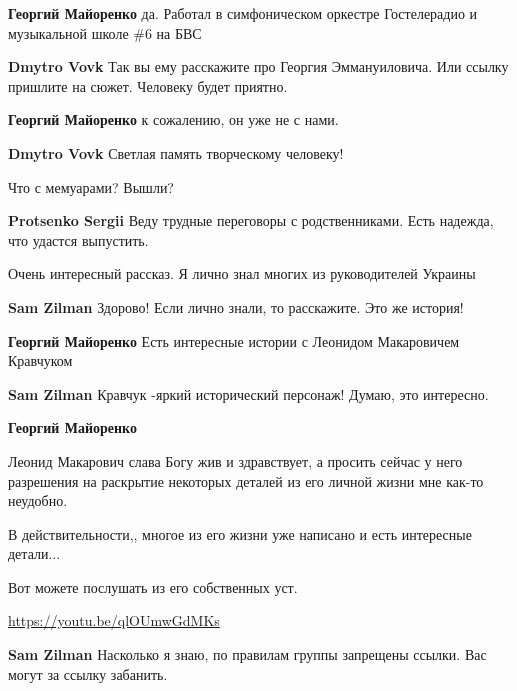 \begin{itemize}
\begin{itemize}
\begin{itemize} %
\textbf{Георгий Майоренко} да. Работал в симфоническом оркестре Гостелерадио и музыкальной школе \#6 на БВС

\textbf{Dmytro Vovk} Так вы ему расскажите про Георгия Эммануиловича. Или ссылку пришлите на сюжет. Человеку будет приятно.

\textbf{Георгий Майоренко} к сожалению, он уже не с нами.

\textbf{Dmytro Vovk} Светлая память творческому человеку!
\end{itemize} %

\end{itemize} %

Что с мемуарами? Вышли?

\begin{itemize} %
\textbf{Protsenko Sergii} Веду трудные переговоры с родственниками. Есть надежда, что удастся выпустить.
\end{itemize} %

Очень интересный рассказ.
Я лично знал многих из руководителей Украины

\begin{itemize} %
\textbf{Sam Zilman} Здорово! Если лично знали, то расскажите. Это же история!

\begin{itemize} %
\textbf{Георгий Майоренко} Есть интересные истории с Леонидом Макаровичем Кравчуком

\textbf{Sam Zilman} Кравчук -яркий исторический персонаж! Думаю, это интересно.

\textbf{Георгий Майоренко} 

Леонид Макарович слава Богу жив и здравствует, а просить сейчас у него
разрешения на раскрытие некоторых деталей из его личной жизни мне как-то
неудобно.

В действительности,, многое из его жизни уже написано и есть интересные детали...

Вот можете послушать из его собственных уст.

\url{https://youtu.be/qlOUmwGdMKs}

\textbf{Sam Zilman} Насколько я знаю, по правилам группы запрещены ссылки. Вас могут за ссылку забанить.


\end{itemize}
\end{itemize}
\end{itemize}
